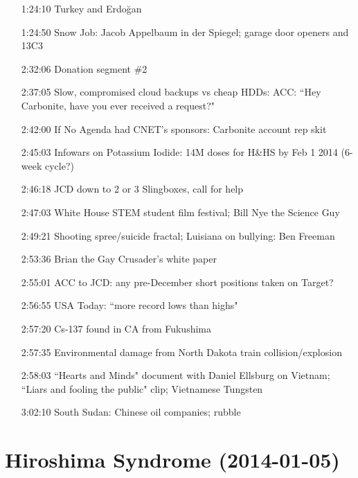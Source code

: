 \documentclass{report}
\newcommand{\mono}[1]{{\fontspec{Courier}#1}}
\begin{document}
\begin{itemize}
\item[\mono{1:24:10}] Turkey and Erdoğan
\item[\mono{1:24:50}] Snow Job: Jacob Appelbaum in der Spiegel; garage door openers and 13C3
\item[\mono{2:32:06}] Donation segment \#2
\item[\mono{2:37:05}] Slow, compromised cloud backups vs cheap HDDs: ACC: ``Hey Carbonite, have you ever received a request?"
\item[\mono{2:42:00}] If No Agenda had CNET's sponsors: Carbonite account rep skit
\item[\mono{2:45:03}] Infowars on Potassium Iodide: 14M doses for H\&HS by Feb 1 2014 (6-week cycle?)
\item[\mono{2:46:18}] JCD down to 2 or 3 Slingboxes, call for help
\item[\mono{2:47:03}] White House STEM student film festival; Bill Nye the Science Guy
\item[\mono{2:49:21}] Shooting spree/suicide fractal; Luisiana on bullying: Ben Freeman
\item[\mono{2:53:36}] Brian the Gay Crusader's white paper
\item[\mono{2:55:01}] ACC to JCD: any pre-December short positions taken on Target?
\item[\mono{2:56:55}] USA Today: ``more record lows than highs"
\item[\mono{2:57:20}] Cs-137 found in CA from Fukushima
\item[\mono{2:57:35}] Environmental damage from North Dakota train collision/explosion
\item[\mono{2:58:03}] ``Hearts and Minds" document with Daniel Ellsburg on Vietnam; ``Liars and fooling the public" clip; Vietnamese Tungsten
\item[\mono{3:02:10}] South Sudan: Chinese oil companies; rubble
\end{itemize}
\setcounter{section}{580}\section[Hiroshima Syndrome]{Hiroshima Syndrome \small{(2014-01-05)}}
\end{document}
